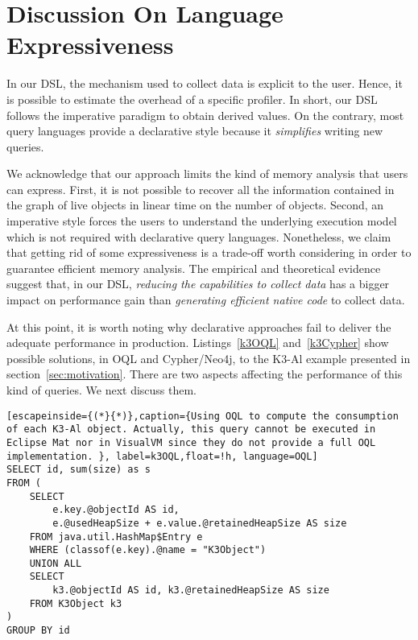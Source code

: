 \section{Discussion On Language Expressiveness}\label{sec:expressiveness}

In our DSL, the mechanism used to collect data is explicit to the user.
Hence, it is possible to estimate the overhead of a specific profiler.
In short, our DSL follows the imperative paradigm to obtain derived values.
On the contrary, most query languages provide a declarative style because it \textit{simplifies} writing new queries.

We acknowledge that our approach limits the kind of memory analysis that users can express.
First, it is not possible to recover all the information contained in the graph of live objects in linear time on the number of objects.
Second, an imperative style forces the users to understand the underlying execution model which is not required with declarative query languages.
Nonetheless, we claim that getting rid of some expressiveness is a trade-off worth considering in order to guarantee efficient memory analysis.
The empirical and theoretical evidence suggest that, in our DSL, \textit{reducing the capabilities to collect data} has a bigger impact on performance gain than \textit{generating efficient native code} to collect data.

At this point, it is worth noting why declarative approaches fail to deliver the adequate performance in production.
Listings~\ref{k3OQL} and~\ref{k3Cypher} show possible solutions, in OQL and Cypher/Neo4j, to the K3-Al example presented in section~\ref{sec:motivation}.
There are two aspects affecting the performance of this kind of queries.
We next discuss them.

\begin{lstlisting}[escapeinside={(*}{*)},caption={Using OQL to compute the consumption of each K3-Al object. Actually, this query cannot be executed in Eclipse Mat nor in VisualVM since they do not provide a full OQL implementation. }, label=k3OQL,float=!h, language=OQL]
SELECT id, sum(size) as s
FROM (
	SELECT
		e.key.@objectId AS id, 
		e.@usedHeapSize + e.value.@retainedHeapSize AS size
	FROM java.util.HashMap$Entry e
	WHERE (classof(e.key).@name = "K3Object")
	UNION ALL
	SELECT 
		k3.@objectId AS id, k3.@retainedHeapSize AS size 
	FROM K3Object k3
)
GROUP BY id
\end{lstlisting}

